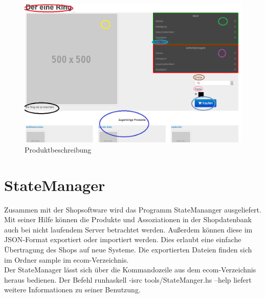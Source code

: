 \begin{figure}[h!]
  \centering
  \includegraphics[width=\textwidth]{UserManual/Produktbeschreibung.png}
  \caption{Produktbeschreibung}
  \label{fig:Produktbeschreibung}
\end{figure}


\section{StateManager}
Zusammen mit der Shopsoftware wird das Programm StateMananger ausgeliefert. Mit seiner Hilfe können die Produkte und Assoziationen in der Shopdatenbank auch bei nicht laufendem Server betrachtet werden. Außerdem können diese im \textsf{JSON}-Format exportiert oder importiert werden. Dies erlaubt eine einfache Übertragung des Shops auf neue Systeme. Die exportierten Dateien finden sich im Ordner sample im \textsf{ecom}-Verzeichnis. \\
Der StateManager lässt sich über die Kommandozeile aus dem ecom-Verzeichnis heraus bedienen. Der Befehl \textsf{runhaskell -isrc tools/StateManger.hs --help} liefert weitere Informationen zu seiner Benutzung. 